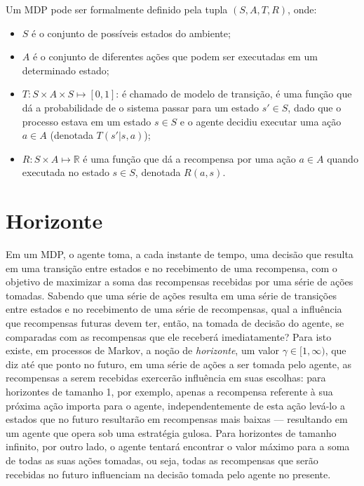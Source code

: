 \documentclass[cic,tc]{iiufrgs}
\begin{document}
Um MDP pode ser formalmente definido pela tupla $ (S, A, T, R)$, onde:

\begin{itemize}
  \item $S$ é o conjunto de possíveis estados do ambiente;
  \item $A$ é o conjunto de diferentes ações que podem ser executadas em um
  determinado estado;
  \item $T: S \times A \times S \mapsto [0,1]$: é chamado de modelo de transição,
  é uma função que dá a
  probabilidade de o sistema passar para um estado $s' \in S$, dado que o
  processo estava em um estado $s \in S$ e o agente decidiu executar uma ação
  $a \in A$ (denotada $T(s'|s,a)$);
  \item $R: S \times A \mapsto \mathbb{R}$ é uma função que dá a recompensa
  por uma ação $a \in A$ quando executada no estado $s \in S$, denotada
  $R(a,s)$.
\end{itemize}

\section{Horizonte}
\label{horizonte}
Em um MDP, o agente toma, a cada instante de tempo, uma decisão que resulta em
uma transição entre estados e no recebimento de uma recompensa, com o objetivo
de maximizar a soma das recompensas recebidas por uma série de ações tomadas.
Sabendo que uma série de ações resulta em uma série de transições entre estados
e no recebimento de uma série de recompensas, qual a influência que recompensas
futuras devem ter, então, na tomada de decisão do agente, se comparadas com as
recompensas que ele receberá imediatamente? Para isto existe, em processos de
Markov, a noção de \textit{horizonte}, um valor $\gamma \in [1, \infty)$, que
diz até que ponto no futuro, em uma
série de ações a ser tomada pelo agente, as recompensas a serem recebidas
exercerão influência em suas escolhas: para horizontes de tamanho 1, por
exemplo, apenas a recompensa referente à sua próxima ação importa para o agente,
independentemente de esta ação levá-lo a estados que no futuro resultarão em
recompensas mais baixas --- resultando em um agente que opera sob uma estratégia
gulosa. Para horizontes de tamanho infinito, por outro lado, o
agente tentará encontrar o valor máximo para a soma de todas as suas ações
tomadas, ou seja, todas as recompensas que serão recebidas no futuro influenciam
na decisão tomada pelo agente no presente.
\end{document}
